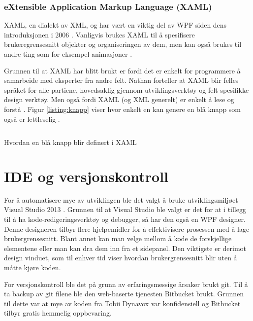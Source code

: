 \subsubsection{eXtensible Application Markup Language (XAML)} 

XAML, en dialekt av XML, og har vært en viktig del av WPF siden dens introduksjonen i 2006 \cite[p.~17]{WPFbook}. Vanligvis brukes XAML til å spesifisere brukeregrensesnitt objekter og organiseringen av dem, men kan også brukes til andre ting som for eksempel animasjoner \cite{Story5:online}. 

Grunnen til at XAML har blitt brukt er fordi det er enkelt for programmere å samarbeide med eksperter fra andre felt. Nathan forteller at XAML blir felles språket for alle partiene, hovedsaklig gjennom utviklingsverktøy og felt-spesifikke design verktøy. Men også fordi XAML (og XML generelt) er enkelt å lese og forstå \cite[p.~17]{WPFbook}. Figur \ref{listing:knapp} viser hvor enkelt en kan genere en blå knapp som også er lettleselig .


\begin{listing}[ht] 
\inputminted[fontsize=\footnotesize, frame=lines,framesep=2mm,baselinestretch=1.2,bgcolor=lightgray,linenos]{xml}{Code/xamlexample.xml} 
\caption{Hvordan en blå knapp blir definert i XAML} 
\label{listing:knapp} 
\end{listing} 
 
   
\section{IDE og versjonskontroll} 

For å automatisere mye av utviklingen ble det valgt å bruke utviklingsmiljøet Visual Studio 2013 \cite{2013-1:online}. Grunnen til at Visual Studio ble valgt er det for at i tillegg til å ha kode-redigeringsverktøy og debugger, så har den også en WPF designer\cite{What8:online}. Denne designeren tilbyr flere hjelpemidler for å effektivisere prosessen med å lage brukergrensesnitt. Blant annet kan man velge mellom å kode de forskjellige elementene eller man kan dra dem inn fra et sidepanel. Den viktigste er derimot design vinduet, som til enhver tid viser hvordan brukergrensesnitt blir uten å måtte kjøre koden\cite{WPF D1:online}. 
 
For versjonskontroll ble det på grunn av erfaringsmessige årsaker brukt git\cite{AboutGit:online}. Til å ta backup av git filene ble den web-baserte tjenesten Bitbucket brukt. Grunnen til dette var at mye av koden fra Tobii Dynavox var konfidensiell og Bitbucket tilbyr gratis hemmelig oppbevaring. 
 
